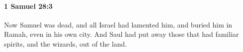 
		\paragraph{1 Samuel 28:3} %
			\label{1SAMUEL-28-3}

			Now Samuel was dead, and all Israel had lamented him, and buried him in Ramah, even in his own city. And Saul had put away those that had familiar spirits, and the wizards, out of the land.


